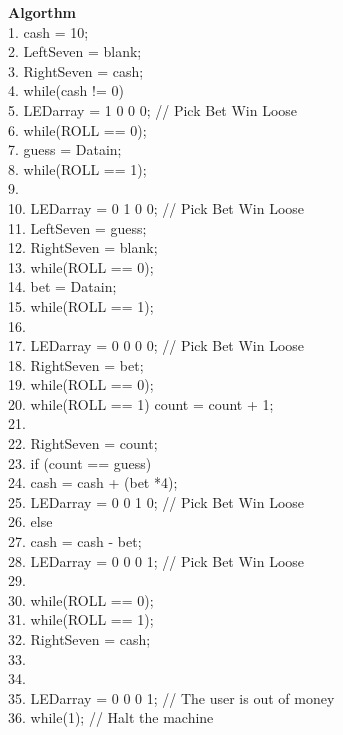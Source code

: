 \documentclass{article}[10 pt,landscape]
\begin{document}
{\bf Algorthm}
{\small
    \\
    1. cash = 10; \\
    2. LeftSeven = blank;     \\
    3. RightSeven = cash;     \\
    4. while(cash != 0) {     \\
        5.     LEDarray = 1 0 0 0;    // Pick Bet Win Loose     \\
        6.     while(ROLL == 0);     \\
        7.     guess = Datain;     \\
        8.     while(ROLL == 1);     \\
        9.          \\
        10.     LEDarray = 0 1 0 0;    // Pick Bet Win Loose     \\
        11.     LeftSeven = guess;     \\
        12.     RightSeven = blank;     \\
        13.     while(ROLL == 0);     \\
        14.     bet = Datain;     \\
        15.     while(ROLL == 1);     \\
        16.          \\
        17.     LEDarray = 0 0 0 0;    // Pick Bet Win Loose     \\
        18.     RightSeven = bet;     \\
        19.     while(ROLL == 0);     \\
        20.     while(ROLL == 1) count = count + 1;     \\
        21.      \\
        22.     RightSeven = count;     \\
        23.     if (count == guess) {     \\
            24.         cash = cash + (bet *4);     \\
            25.         LEDarray = 0 0 1 0;    // Pick Bet Win Loose     \\
        26.     } else {     \\
            27.         cash = cash - bet;     \\
            28.         LEDarray = 0 0 0 1;    // Pick Bet Win Loose     \\
        29.     }     \\
        30.     while(ROLL == 0);     \\
        31.     while(ROLL == 1);     \\
        32.     RightSeven = cash;     \\
        33.      \\
    34. }         \\
    35. LEDarray = 0 0 0 1;    // The user is out of money     \\
    36. while(1);        // Halt the machine     \\
}
\end{document}
